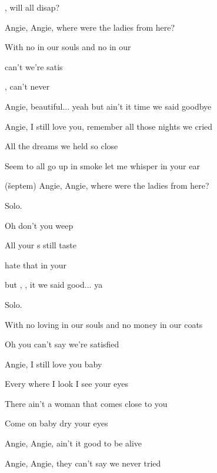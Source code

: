 

\zs
{},   will   all disap?

Angie, Angie, where were the ladies from here?
\ks

\zr
With no  in our souls and no  in our 

 can't  we're satis

,   can't   never 
\kr

\zs
Angie, beautiful... yeah but ain't it time we said goodbye

Angie, I still love you, remember all those nights we cried
\ks

\zr
All the dreams we held so close

Seem to all go up in smoke let me whisper in your ear

(šeptem) Angie, Angie, where were the ladies from here?
\kr

Solo.

\zr
Oh  don't you weep

All your s still taste 

 hate that  in your 

but , ,  it  we said good... ya
\kr

Solo.

\zr
With no {loving} in our souls
and no {money} in our {coats}

{Oh} you can't {say} we're satisfied
\kr

\zs
Angie, I still love you baby

Every where I look I see your eyes
\ks

\zs
{There} ain't a woman that comes {close} to you

{Come} on {baby} dry your {eyes}

Angie, {Angie,} {ain't} it {good} to be alive

Angie, Angie, they can't say we never tried
\ks

\kp





